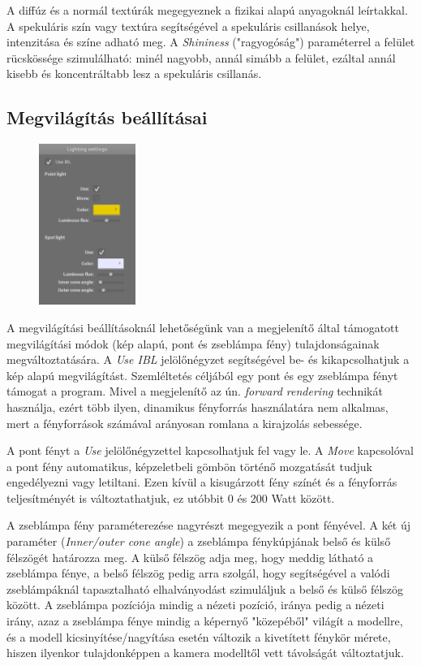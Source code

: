 A diffúz és a normál textúrák megegyeznek a fizikai alapú anyagoknál leírtakkal. A spekuláris szín vagy textúra segítségével a spekuláris csillanások helye, intenzitása és színe adható meg. A \textit{Shininess} ("ragyogóság") paraméterrel a felület rücskössége szimulálható: minél nagyobb, annál simább a felület, ezáltal annál kisebb és koncentráltabb lesz a spekuláris csillanás.

\subsection{Megvilágítás beállításai}

\begin{figure}
    \vspace{-23pt}
    \includegraphics[width=0.28\textwidth]{images/lighting_settings.png}
    \vspace{-20pt}
\end{figure}

A megvilágítási beállításoknál lehetőségünk van a megjelenítő által támogatott megvilágítási módok (kép alapú, pont és zseblámpa fény) tulajdonságainak megváltoztatására. A \textit{Use IBL} jelölőnégyzet segítségével be- és kikapcsolhatjuk a kép alapú megvilágítást. Szemléltetés céljából egy pont és egy zseblámpa fényt támogat a program. Mivel a megjelenítő az ún. \textit{forward rendering} technikát használja, ezért több ilyen, dinamikus fényforrás használatára nem alkalmas, mert a fényforrások számával arányosan romlana a kirajzolás sebessége.

A pont fényt a \textit{Use} jelölőnégyzettel kapcsolhatjuk fel vagy le. A \textit{Move} kapcsolóval a pont fény automatikus, képzeletbeli gömbön történő mozgatását tudjuk engedélyezni vagy letiltani. Ezen kívül a kisugárzott fény színét és a fényforrás teljesítményét is változtathatjuk, ez utóbbit 0 és 200 Watt között.

A zseblámpa fény paraméterezése nagyrészt megegyezik a pont fényével. A két új paraméter (\textit{Inner/outer cone angle}) a zseblámpa fénykúpjának belső és külső félszögét határozza meg. A külső félszög adja meg, hogy meddig látható a zseblámpa fénye, a belső félszög pedig arra szolgál, hogy segítségével a valódi zseblámpáknál tapasztalható elhalványodást szimuláljuk a belső és külső félszög között. A zseblámpa pozíciója mindig a nézeti pozíció, iránya pedig a nézeti irány, azaz a zseblámpa fénye mindig a képernyő "közepéből" világít a modellre, és a modell kicsinyítése/nagyítása esetén változik a kivetített fénykör mérete, hiszen ilyenkor tulajdonképpen a kamera modelltől vett távolságát változtatjuk.
